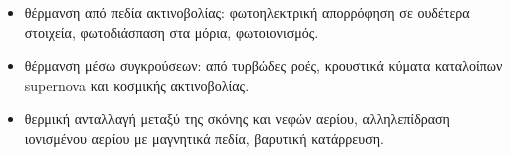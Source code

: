 \documentclass[article,a4paper,11.2pt]{memoir}
\numberwithin{equation}{subsection}
\begin{document}
\begin{itemize}
	\item θέρμανση από πεδία ακτινοβολίας: φωτοηλεκτρική απορρόφηση σε ουδέτερα στοιχεία, φωτοδιάσπαση στα μόρια, φωτοιονισμός.
	\item θέρμανση μέσω συγκρούσεων: από τυρβώδες ροές, κρουστικά κύματα καταλοίπων supernova και κοσμικής ακτινοβολίας.
	\item θερμική ανταλλαγή μεταξύ της σκόνης και νεφών αερίου, αλληλεπίδραση ιονισμένου αερίου με μαγνητικά πεδία, βαρυτική κατάρρευση. 
\end{itemize}

%
%
\end{document}
